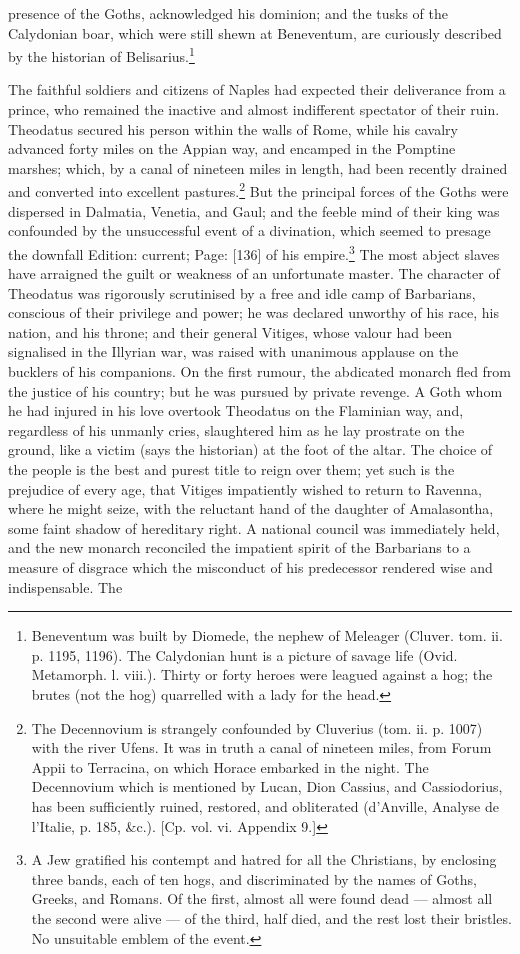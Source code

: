 presence of the Goths, acknowledged his dominion; and the tusks of the Calydonian boar, which were still shewn at Beneventum, are curiously described by the historian of Belisarius.\footnote{Beneventum was built by Diomede, the nephew of Meleager (Cluver. tom. ii. p. 1195, 1196). The Calydonian hunt is a picture of savage life (Ovid. Metamorph. l. viii.). Thirty or forty heroes were leagued against a hog; the brutes (not the hog) quarrelled with a lady for the head.}

The faithful soldiers and citizens of Naples had expected their deliverance from a prince, who remained the inactive and almost indifferent spectator of their ruin. Theodatus secured his person within the walls of Rome, while his cavalry advanced forty miles on the Appian way, and encamped in the Pomptine marshes; which, by a canal of nineteen miles in length, had been recently drained and converted into excellent pastures.\footnote{The Decennovium is strangely confounded by Cluverius (tom. ii. p. 1007) with the river Ufens. It was in truth a canal of nineteen miles, from Forum Appii to Terracina, on which Horace embarked in the night. The Decennovium which is mentioned by Lucan, Dion Cassius, and Cassiodorius, has been sufficiently ruined, restored, and obliterated (d\texthebrew{}’Anville, Analyse de l\texthebrew{}’Italie, p. 185, \&c.). [Cp. vol. vi. Appendix 9.]} But the principal forces of the Goths were dispersed in Dalmatia, Venetia, and Gaul; and the feeble mind of their king was confounded by the unsuccessful event of a divination, which seemed to presage the downfall Edition: current; Page: [136] of his empire.\footnote{A Jew gratified his contempt and hatred for all the Christians, by enclosing three bands, each of ten hogs, and discriminated by the names of Goths, Greeks, and Romans. Of the first, almost all were found dead \texthebrew{—} almost all the second were alive \texthebrew{—} of the third, half died, and the rest lost their bristles. No unsuitable emblem of the event.} The most abject slaves have arraigned the guilt or weakness of an unfortunate master. The character of Theodatus was rigorously scrutinised by a free and idle camp of Barbarians, conscious of their privilege and power; he was declared unworthy of his race, his nation, and his throne; and their general Vitiges, whose valour had been signalised in the Illyrian war, was raised with unanimous applause on the bucklers of his companions. On the first rumour, the abdicated monarch fled from the justice of his country; but he was pursued by private revenge. A Goth whom he had injured in his love overtook Theodatus on the Flaminian way, and, regardless of his unmanly cries, slaughtered him as he lay prostrate on the ground, like a victim (says the historian) at the foot of the altar. The choice of the people is the best and purest title to reign over them; yet such is the prejudice of every age, that Vitiges impatiently wished to return to Ravenna, where he might seize, with the reluctant hand of the daughter of Amalasontha, some faint shadow of hereditary right. A national council was immediately held, and the new monarch reconciled the impatient spirit of the Barbarians to a measure of disgrace which the misconduct of his predecessor rendered wise and indispensable. The 